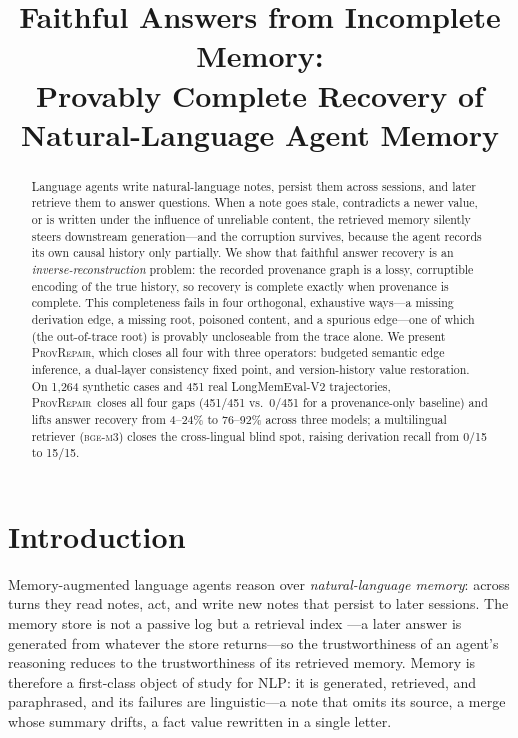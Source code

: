 \documentclass[11pt]{article}
\title{Faithful Answers from Incomplete Memory:\\ Provably Complete Recovery of Natural-Language Agent Memory}
\theoremstyle{remark}
\newcommand{\ours}{\textsc{ProvRepair}}
\newcommand{\anchor}{provenance-only baseline}
\begin{document}
\maketitle

\begin{abstract}
Language agents write natural-language notes, persist them across sessions, and later
retrieve them to answer questions. When a note goes stale, contradicts a newer value, or
is written under the influence of unreliable content, the retrieved memory silently steers
downstream generation---and the corruption survives, because the agent records its own
causal history only partially. We show that faithful answer recovery is an
\emph{inverse-reconstruction} problem: the recorded provenance graph is a lossy,
corruptible encoding of the true history, so recovery is complete exactly when provenance
is complete. This completeness fails in four orthogonal, exhaustive ways---a missing
derivation edge, a missing root, poisoned content, and a spurious edge---one of which (the
out-of-trace root) is provably uncloseable from the trace alone. We present \ours, which
closes all four with three operators: budgeted semantic edge inference, a dual-layer
consistency fixed point, and version-history value restoration. On 1{,}264 synthetic cases
and 451 real LongMemEval-V2 trajectories, \ours\ closes all four gaps (451/451 vs.\ 0/451
for a \anchor) and lifts answer recovery from 4--24\% to 76--92\% across three models; a
multilingual retriever (\textsc{bge-m3}) closes the cross-lingual blind spot, raising
derivation recall from 0/15 to 15/15.
\end{abstract}

\section{Introduction}

Memory-augmented language agents \citep{park2023generative,packer2023memgpt,zhong2024memorybank}
reason over \emph{natural-language memory}: across
turns they read notes, act, and write new notes that persist to later sessions. The
memory store is not a passive log but a retrieval index
\citep{lewis2020rag,karpukhin2020dpr}---a later answer is generated
from whatever the store returns---so the trustworthiness of an agent's reasoning
reduces to the trustworthiness of its retrieved memory. Memory is therefore a
first-class object of study for NLP: it is generated, retrieved, and paraphrased, and
its failures are linguistic---a note that omits its source, a merge whose summary
drifts, a fact value rewritten in a single letter.
\end{document}
